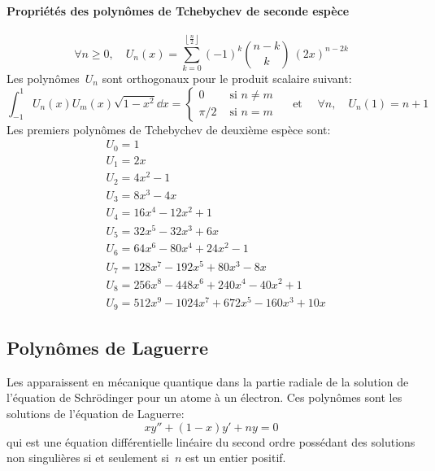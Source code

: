 \paragraph{Propriétés des polynômes de Tchebychev de seconde espèce} 
\begin{equation}
\forall n\ge 0, \quad U_n(x)=\sum_{k=0}^{\left\lfloor \frac n2\right \rfloor}(-1)^k \binom{n-k}k~(2x)^{n-2k} 
\end{equation}
Les polynômes~$U_n$ sont orthogonaux pour le produit scalaire suivant: 
\begin{equation}
\int_{-1}^1 U_n(x)U_m(x)\sqrt{1-x^2}\dd x = 
\begin{cases} 0&\text{ si } n\ne m\\ \pi/2 &\text{ si } n=m 
\end{cases} 
\quad\text{ et }\quad\forall n,\quad U_n(1)=n+1 
\end{equation}
Les premiers polynômes de Tchebychev de deuxième espèce sont:
\begin{equation}
\begin{aligned}
&U_0 = 1 \\
&U_1 = 2x \\
&U_2 = 4x^2 - 1 \\
&U_3 = 8x^3 - 4x \\
&U_4 = 16x^4 - 12x^2 + 1 \\
&U_5 = 32x^5 - 32x^3 + 6x \\
&U_6 = 64x^6 - 80x^4 + 24x^2 - 1 \\
&U_7 = 128x^7 - 192x^5 + 80x^3 - 8x \\
&U_8 = 256x^8 - 448 x^6 + 240 x^4 - 40 x^2 + 1 \\
&U_9 = 512x^9 - 1024 x^7 + 672 x^5 - 160 x^3 + 10 x
\end{aligned}
\end{equation}

\medskip
\subsection{Polynômes de Laguerre} 

Les  apparaissent en mécanique quantique dans la partie radiale de la solution de l'équation de Schrödinger pour un atome à un électron. Ces polynômes sont les solutions de l'équation de Laguerre: 
\begin{equation}
 xy'' + (1 - x)y' + ny = 0 
\end{equation}
qui est une équation différentielle linéaire du second ordre possédant des solutions non singulières si et seulement si~$n$ est un entier positif. 

